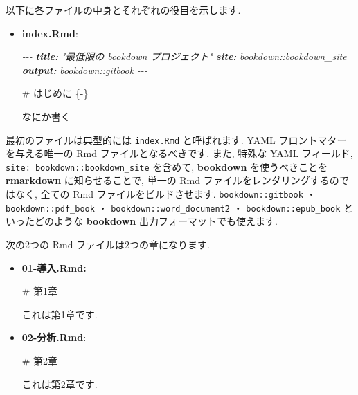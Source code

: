 \documentclass[
  11pt,
  lualatex,
  ja=standard]{bxjsreport}
\newenvironment{Shaded}{\begin{snugshade}}{\end{snugshade}}
\newcommand{\AnnotationTok}[1]{\textcolor[rgb]{0.56,0.35,0.01}{\textbf{\textit{#1}}}}
\newcommand{\CommentTok}[1]{\textcolor[rgb]{0.56,0.35,0.01}{\textit{#1}}}
\newcommand{\FunctionTok}[1]{\textcolor[rgb]{0.00,0.00,0.00}{#1}}
\newcommand{\NormalTok}[1]{#1}
\begin{document}
以下に各ファイルの中身とそれぞれの役目を示します.

\begin{itemize}
\item
  \textbf{index.Rmd}:

\begin{Shaded}
\begin{Highlighting}[]
\CommentTok{{-}{-}{-}}
\AnnotationTok{title:}\CommentTok{ "最低限の bookdown プロジェクト"}
\AnnotationTok{site:}\CommentTok{ bookdown::bookdown\_site}
\AnnotationTok{output:}\CommentTok{ bookdown::gitbook}
\CommentTok{{-}{-}{-}}

\FunctionTok{\# はじめに \{{-}\}}

\NormalTok{なにか書く}
\end{Highlighting}
\end{Shaded}
\end{itemize}

最初のファイルは典型的には \texttt{index.Rmd} と呼ばれます. YAML フロントマターを与える唯一の Rmd ファイルとなるべきです. また, 特殊な YAML フィールド, \texttt{site: bookdown::bookdown\_site} を含めて, \textbf{bookdown} を使うべきことを \textbf{rmarkdown} に知らせることで, 単一の Rmd ファイルをレンダリングするのではなく, 全ての Rmd ファイルをビルドさせます. \texttt{bookdown::gitbook} ・ \texttt{bookdown::pdf\_book} ・ \texttt{bookdown::word\_document2} ・ \texttt{bookdown::epub\_book} といったどのような \textbf{bookdown} 出力フォーマットでも使えます.

次の2つの Rmd ファイルは2つの章になります.

\begin{itemize}
\item
  \textbf{01-導入.Rmd:}

\begin{Shaded}
\begin{Highlighting}[]
\FunctionTok{\# 第1章}

\NormalTok{これは第1章です.}
\end{Highlighting}
\end{Shaded}
\item
  \textbf{02-分析.Rmd}:

\begin{Shaded}
\begin{Highlighting}[]
\FunctionTok{\# 第2章}

\NormalTok{これは第2章です.}
\end{Highlighting}
\end{Shaded}
\end{itemize}
\end{document}
